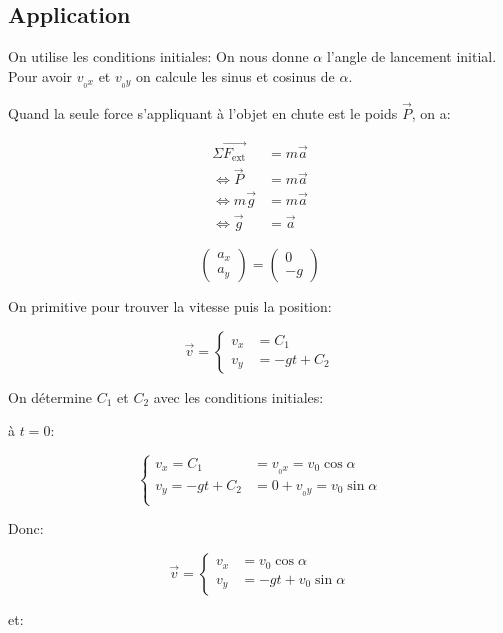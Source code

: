 \documentclass{article}
\newcommand{\vect}{\overrightarrow}
\begin{document}
\subsection{Application}

On utilise les conditions initiales:
On nous donne $\alpha$ l'angle de lancement initial.
Pour avoir $v_{_0x}$ et $v_{_0y}$ on calcule les sinus et cosinus de $\alpha$.

Quand la seule force s'appliquant à l'objet en chute est le poids $\vec{P}$, on a:

\begin{equation*}
    \begin{split}
        \Sigma \vect{F_\text{ext}} &= m \vec a \\
        \iff \vec P &= m \vec a\\
        \iff m \vec g &= m \vec a \\
        \iff \vec g &= \vec a
    \end{split}
\end{equation*}

$$
\begin{pmatrix}
a_x \\ a_y
\end{pmatrix} = \begin{pmatrix}
0 \\ -g
\end{pmatrix}
$$

On primitive pour trouver la vitesse puis la position:

$$
\vec v = \begin{cases}
v_x &= C_1 \\
v_y &= -gt + C_2
\end{cases}
$$

On détermine $C_1$ et $C_2$ avec les conditions initiales:

à $t=0$:

$$
\begin{cases}
v_x = C_1 &= v_{_0x} = v_0 \cos \alpha \\
v_y = -gt + C_2 &= 0 + v_{_0y} = v_0 \sin \alpha \\
\end{cases}
$$

Donc: 

$$
\vec v = \begin{cases}
v_x &= v_0 \cos \alpha \\
v_y &= -gt + v_0\sin\alpha
\end{cases}
$$

et:
\end{document}
